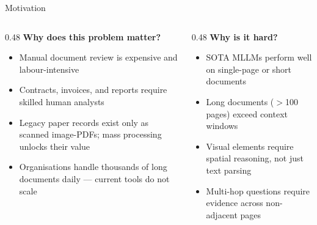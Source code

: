 \documentclass[aspectratio=169]{beamer}
\begin{document}
\begin{frame}{Motivation}

  \begin{columns}[T]

    \begin{column}{0.48\textwidth}
      \textbf{Why does this problem matter?}
      \vspace{0.2cm}
      \begin{itemize}
        \item Manual document review is expensive and labour-intensive
        \item Contracts, invoices, and reports require skilled human analysts
        \item Legacy paper records exist only as scanned image-PDFs;
              mass processing unlocks their value
        \item Organisations handle thousands of long documents daily
              — current tools do not scale
      \end{itemize}
    \end{column}

    \begin{column}{0.48\textwidth}
      \textbf{Why is it hard?}
      \vspace{0.2cm}
      \begin{itemize}
        \item SOTA MLLMs perform well on single-page or short documents
        \item Long documents ($>$100 pages) exceed context windows
        \item Visual elements require spatial reasoning, not just text parsing
        \item Multi-hop questions require evidence across
              non-adjacent pages
      \end{itemize}
    \end{column}

  \end{columns}

\end{frame}
\end{document}
